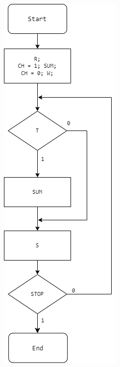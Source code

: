 \documentclass[12pt,a4paper]{article}
\begin{document}
\begin{figure}[h!]
\begin{subfigure}[t]{0.45\textwidth}
        \end{subfigure}
        \hfill
        \begin{subfigure}[t]{0.45\textwidth}
            \centering
            \includegraphics[width=\linewidth]{FS3_alg.png}
        \end{subfigure}
    
        \label{fig:microalg2}

    \end{figure}
\end{document}
